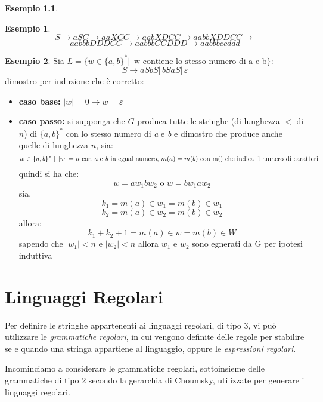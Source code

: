 \documentclass[a4paper]{book}
\theoremstyle{definition}%
\newtheorem*{esempio}{Esempio}
\begin{document}
\begin{esempio}
\begin{esempio}
$$S\to aSC\to aaXCC\to aabXDCC\to aabbXDDCC\to $$
$$aabbbDDDCC\to aabbbCCDDD\to aabbbccddd$$
\end{esempio}
\begin{esempio}
Sia $L=\{w\in\{a,b\}^*|\, \mbox{ w contiene lo stesso numero di a e b}\}$:
$$S\to aSbS|\,bSaS|\, \varepsilon$$
dimostro per induzione che è corretto:
\begin{itemize}
\item \textbf{caso base:} $|w|=0\to w=\varepsilon$
\item \textbf{caso passo:} si supponga che $G$ produca tutte le stringhe (di lunghezza $<$ di $n$) di $\{a,b\}^*$ con lo stesso numero di \textit{a} e \textit{b} e dimostro che produce anche quelle di lunghezza $n$, sia:
$$w\in \{a,b\}^* \mid\, |w|=n \mbox{ con\textit{ a} e \textit{b} in egual numero, }m(a)=m(b) \mbox{ con m() che indica il numero di caratteri}$$
quindi si ha che:
$$w=aw_1bw_2\mbox{ o } w=bw_1aw_2$$
sia.
$$k_1=m(a)\in w_1=m(b)\in w_1$$
$$k_2=m(a)\in w_2=m(b)\in w_2$$
allora:
$$k_1+k_2+1=m(a)\in w= m(b)\in W$$
sapendo che $|w_1|<n$ e $|w_2|<n$ allora $w_1$ e $w_2$ sono egnerati da G per ipotesi induttiva
\end{itemize}
\end{esempio}

\chapter{Linguaggi Regolari}
  Per definire le stringhe appartenenti ai linguaggi regolari, di tipo 3, vi può utilizzare le \emph{grammatiche regolari},
  in cui vengono definite delle regole per stabilire se e quando una stringa appartiene al linguaggio, oppure le \emph{espressioni regolari}.

  Incominciamo a considerare le grammatiche regolari, sottoinsieme delle grammatiche di tipo 2 secondo la gerarchia di Choumsky,
  utilizzate per generare i linguaggi regolari.
  

\end{esempio}
\end{document}

